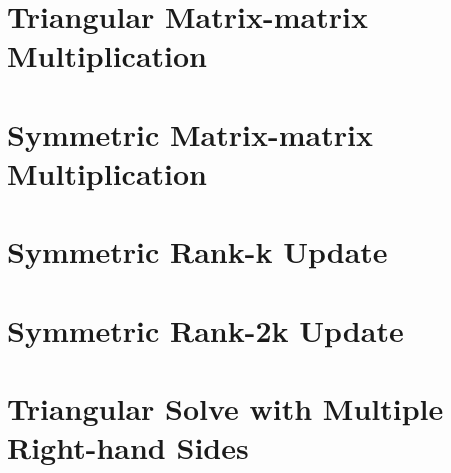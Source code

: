 \documentclass[twoside,openright,12pt]{book}
\begin{document}
\part{Triangular Matrix-matrix Multiplication}





\part{Symmetric Matrix-matrix Multiplication}



\part{Symmetric Rank-k Update}



\part{Symmetric Rank-2k Update}



\part{Triangular Solve with Multiple Right-hand Sides}


\end{document}
